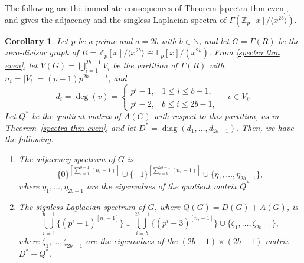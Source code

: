 \documentclass[12pt,twoside]{article}
\newtheorem{corollary}[theorem]{Corollary}
\begin{document}
%
The following are the immediate consequences of Theorem \ref{spectra thm even}, and gives the adjacency and the singless Laplacian spectra of $ \varGamma(\mathbb{Z}_p[x]/\langle x^{2b}\rangle).$
\begin{corollary}\label{cor:adj-Q-even}
	Let $p$ be a prime and $a=2b$ with $b\in\mathbb{N}$, and let $ G= \varGamma(R)$ be the zero-divisor graph of $R = \mathbb{Z}_p[x]/\langle x^{2b}\rangle \cong \mathbb{F}_p[x]/(x^{2b}).$ From \ref{spectra thm even}, let $V(G)=\bigcup_{i=1}^{2b-1}V_i$ be the partition of $ \varGamma(R)$ with
	$n_i = |V_i| = (p-1)p^{ 2b-1-i}$, and
	\[
	d_i = \deg(v) =
	\begin{cases}
		p^{ i}-1, & 1\le i\le b-1,\\[3pt]
		p^{ i}-2, & b\le i\le 2b-1,
	\end{cases}
	\quad v\in V_i.
	\]
	Let $Q^\ast$ be the quotient matrix of $A(G)$ with respect to this partition, as in Theorem~\ref{spectra thm even}, and let $D^\ast = \operatorname{diag}(d_1,\dots,d_{2b-1}).$
	Then, we have the following.
	\begin{enumerate}
		\item The adjacency spectrum of $G$ is
		\[
		\{0\}^{\left[\sum_{i=1}^{b-1}(n_i-1)\right]}
		\cup
		\{-1\}^{\left[\sum_{i=b}^{2b-1}(n_i-1)\right]}
		\cup
		\{\eta_1,\dots,\eta_{2b-1}\},
		\]
		where $\eta_1,\dots,\eta_{2b-1}$ are the eigenvalues of the quotient matrix $Q^\ast$.
		
		\item The signless Laplacian spectrum of $G$, where $Q(G)=D(G)+A(G)$, is
		\[
		\bigcup_{i=1}^{b-1} \{(p^{ i}-1)^{[ n_i-1 ]}\} \cup \bigcup_{i=b}^{2b-1} \{(p^{ i}-3)^{[ n_i-1 ]}\} \cup 	\{\zeta_1,\dots,\zeta_{2b-1}\},
		\]
		where $\zeta_1,\dots,\zeta_{2b-1}$ are the eigenvalues of the $(2b-1)\times(2b-1)$ matrix $D^\ast + Q^\ast.$
	\end{enumerate}
\end{corollary}
\end{document}

